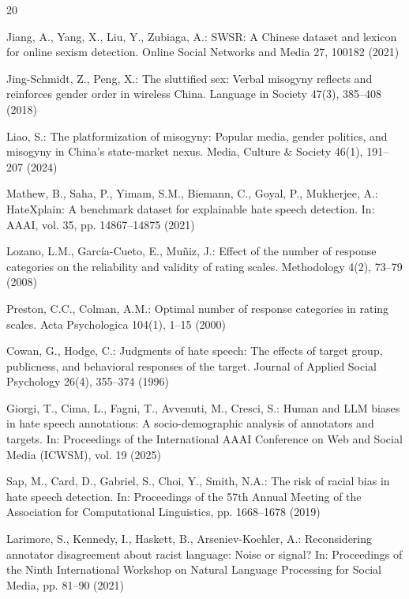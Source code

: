 \documentclass[runningheads]{llncs}
\begin{document}
\begin{thebibliography}{20}

Jiang, A., Yang, X., Liu, Y., Zubiaga, A.: SWSR: A Chinese dataset and lexicon for online sexism detection. Online Social Networks and Media 27, 100182 (2021)

Jing-Schmidt, Z., Peng, X.: The sluttified sex: Verbal misogyny reflects and reinforces gender order in wireless China. Language in Society 47(3), 385--408 (2018)

Liao, S.: The platformization of misogyny: Popular media, gender politics, and misogyny in China's state-market nexus. Media, Culture \& Society 46(1), 191--207 (2024)

Mathew, B., Saha, P., Yimam, S.M., Biemann, C., Goyal, P., Mukherjee, A.: HateXplain: A benchmark dataset for explainable hate speech detection. In: AAAI, vol. 35, pp. 14867--14875 (2021)

Lozano, L.M., Garc\'ia-Cueto, E., Mu\~niz, J.: Effect of the number of response categories on the reliability and validity of rating scales. Methodology 4(2), 73--79 (2008)

Preston, C.C., Colman, A.M.: Optimal number of response categories in rating scales. Acta Psychologica 104(1), 1--15 (2000)

Cowan, G., Hodge, C.: Judgments of hate speech: The effects of target group, publicness, and behavioral responses of the target. Journal of Applied Social Psychology 26(4), 355--374 (1996)

Giorgi, T., Cima, L., Fagni, T., Avvenuti, M., Cresci, S.: Human and LLM biases in hate speech annotations: A socio-demographic analysis of annotators and targets. In: Proceedings of the International AAAI Conference on Web and Social Media (ICWSM), vol. 19 (2025)

Sap, M., Card, D., Gabriel, S., Choi, Y., Smith, N.A.: The risk of racial bias in hate speech detection. In: Proceedings of the 57th Annual Meeting of the Association for Computational Linguistics, pp. 1668--1678 (2019)

Larimore, S., Kennedy, I., Haskett, B., Arseniev-Koehler, A.: Reconsidering annotator disagreement about racist language: Noise or signal? In: Proceedings of the Ninth International Workshop on Natural Language Processing for Social Media, pp. 81--90 (2021)


\end{thebibliography}
\end{document}
